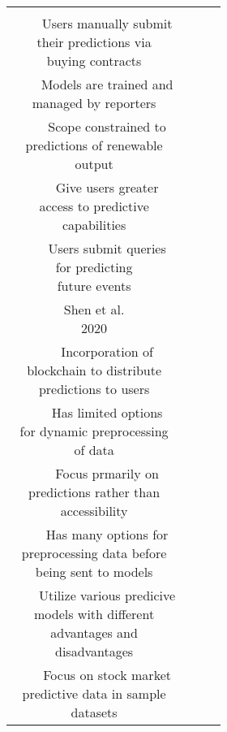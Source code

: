 \documentclass{article}
\newcommand{\tabitem}{\\~~\llap{\textbullet}~~}
\begin{document}
\begin{table}[H]
\begin{center}
\begin{tabular}{c|c|c|c}
{                    \tabitem Users manually submit \\ their predictions via \\ buying contracts \\
                    \tabitem Models are trained and\\managed by reporters\\
                    \tabitem Scope constrained to\\predictions of renewable\\output
                } &
                \makecell[l]{
                    \tabitem Give users greater\\access to predictive\\capabilities \\
                    \tabitem Users submit queries\\for predicting\\future events\\
                } \\\hline
                \makecell[l]{Shen et al.\\2020\cite{deepPrediction}} &
                \makecell[l]{
                    \tabitem Incorporation of\\blockchain to distribute\\predictions to users\\
                    \tabitem Has limited options\\for dynamic preprocessing\\of data\\
                } &
                \makecell[l]{
                    \tabitem Focus prmarily on\\predictions rather than\\accessibility\\
                    \tabitem Has many options for\\preprocessing data before\\ being sent to models\\
                } &
                \makecell[l]{
                    \tabitem Utilize various predicive\\models with different\\advantages and\\disadvantages\\
                    \tabitem Focus on stock market\\predictive data in sample\\datasets\\
                }\\\hline
            \end{tabular}
            \egroup
        \end{center}
    \end{table}
\end{document}
